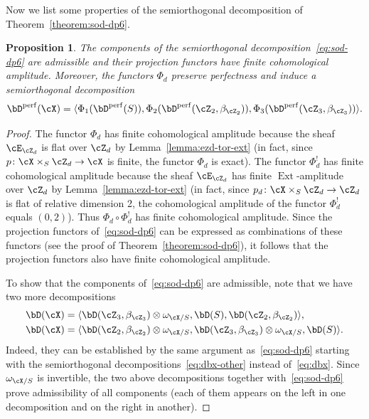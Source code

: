 \documentclass[11pt]{amsart}
\DeclareMathOperator{\Ext}{\mathrm{Ext}}
\theoremstyle{plain}
\newtheorem{proposition}[theorem]{Proposition}
\theoremstyle{definition}
\theoremstyle{remark}
\begin{document}
Now we list some properties of the semiorthogonal decomposition of Theorem~\ref{theorem:sod-dp6}.

\begin{proposition}\label{proposition:sod-dp6-perfect-unbounded}
The components of the semiorthogonal decomposition~\eqref{eq:sod-dp6} are admissible and their projection functors have finite cohomological amplitude.
Moreover, the functors $\Phi_d$ preserve perfectness and induce a semiorthogonal decomposition
\begin{equation}
\label{eq:sod-dpx-perf}
\bD^{\mathrm{perf}}(\cX) = \langle \Phi_1(\bD^{\mathrm{perf}}(S)), \Phi_2(\bD^{\mathrm{perf}}(\cZ_2,\beta_{\cZ_2})), \Phi_3(\bD^{\mathrm{perf}}(\cZ_3,\beta_{\cZ_3})) \rangle.
\end{equation}
\end{proposition}
\begin{proof}
The functor $\Phi_d$ has finite cohomological amplitude because the sheaf $\cE_{\cZ_d}$ is flat over $\cZ_d$ by Lemma~\ref{lemma:ezd-tor-ext}
(in fact, since $p \colon \cX \times_S \cZ_d \to \cX$ is finite, the functor $\Phi_d$ is exact).
The functor $\Phi_d^!$ has finite cohomological amplitude because the sheaf $\cE_{\cZ_d}$ has finite $\Ext$-amplitude over $\cZ_d$ by Lemma~\ref{lemma:ezd-tor-ext}
(in fact, since $p_d \colon \cX \times_S \cZ_d \to \cZ_d$ is flat of relative dimension 2, the cohomological amplitude of the functor $\Phi_d^!$ equals $(0,2)$).
Thus $\Phi_d \circ \Phi_d^!$ has finite cohomological amplitude.
Since the projection functors of~\eqref{eq:sod-dp6} can be expressed as combinations of these functors
(see the proof of Theorem~\ref{theorem:sod-dp6}), 
it follows that the projection functors also have finite cohomological amplitude.



To show that the components of~\eqref{eq:sod-dp6} are admissible, note that we have two more decompositions
\begin{equation}
\label{eq:more-sod-cx}
\begin{aligned}
\bD(\cX) &= \langle \bD(\cZ_3,\beta_{\cZ_3}) \otimes \omega_{\cX/S}, \bD(S), \bD(\cZ_2, \beta_{\cZ_2}) \rangle,
\\
\bD(\cX) &= \langle \bD(\cZ_2, \beta_{\cZ_2}) \otimes \omega_{\cX/S}, \bD(\cZ_3,\beta_{\cZ_3}) \otimes \omega_{\cX/S}, \bD(S) \rangle.
\end{aligned}
\end{equation} 
Indeed, they can be established by the same argument as~\eqref{eq:sod-dp6} 
starting with the semiorthogonal decompositions~\eqref{eq:dbx-other} instead of~\eqref{eq:dbx}.
Since $\omega_{\cX/S}$ is invertible, the two above decompositions together with~\eqref{eq:sod-dp6} 
prove admissibility of all components (each of them appears on the left in one decomposition and on the right in another).


\end{proof}
\end{document}
